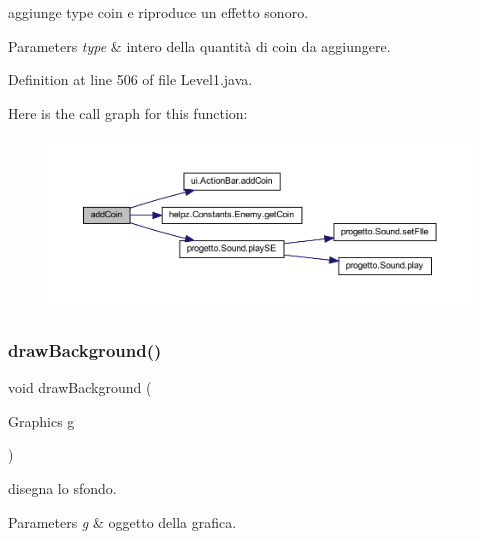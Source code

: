 aggiunge \textquotesingle{}type\textquotesingle{} coin e riproduce un effetto sonoro. 


\begin{DoxyParams}{Parameters}
{\em type} & intero della quantità di coin da aggiungere. \\
\hline
\end{DoxyParams}


Definition at line 506 of file Level1.\+java.

Here is the call graph for this function\+:\nopagebreak
\begin{figure}[H]
\begin{center}
\leavevmode
\includegraphics[width=350pt]{classscenes_1_1_level1_a9f0f7dc28e596d2ebcd06e27ef05d9fd_cgraph}
\end{center}
\end{figure}
\mbox{\label{classscenes_1_1_level1_a62bcb07be9e39896e5837a9d396e7235}} 
\subsubsection{\texorpdfstring{draw\+Background()}{drawBackground()}}
{\footnotesize\ttfamily void draw\+Background (\begin{DoxyParamCaption}\item[{Graphics}]{g }\end{DoxyParamCaption})\hspace{0.3cm}{\ttfamily [private]}}



disegna lo sfondo. 


\begin{DoxyParams}{Parameters}
{\em g} & oggetto della grafica. \\
\hline
\end{DoxyParams}



